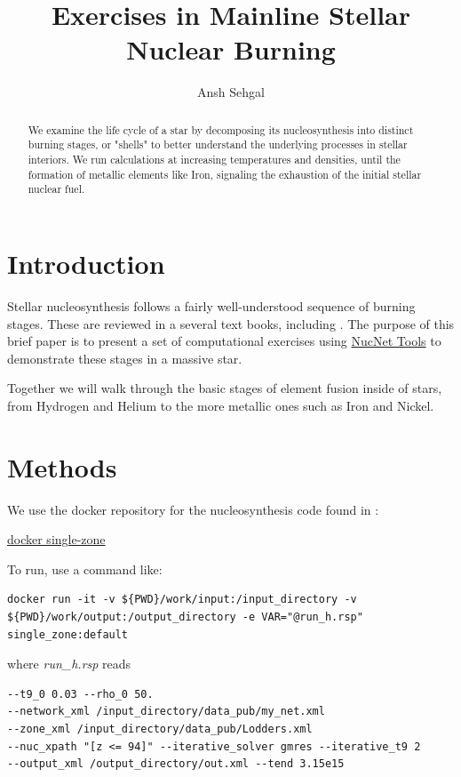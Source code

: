 \documentclass[manuscript]{aastex62}
\begin{document}
\title{Exercises in Mainline Stellar Nuclear Burning}


\author{Ansh Sehgal}

\begin{abstract}
We examine the life cycle of a star by decomposing its nucleosynthesis into distinct burning stages, or "shells" to better understand the underlying processes in stellar interiors. We run calculations at increasing temperatures and densities, until the formation of metallic elements like Iron, signaling the exhaustion of the initial stellar nuclear fuel.
\end{abstract}

\section{Introduction}

Stellar nucleosynthesis follows a fairly well-understood sequence of burning
stages.  These are reviewed in a several text books, including
\cite{1983psen.book.....C,1996snai.book.....A,2007nps..book.....I}.
The purpose of this brief paper is to present a set of computational
exercises using
\href{http://sourceforge.net/projects/nucnet-tools/}{NucNet Tools}
to demonstrate these stages in a massive star.

Together we will walk through the basic stages of element fusion inside of stars, from Hydrogen and Helium to the more metallic ones such as Iron and Nickel.

\section{Methods} \label{sec:docker}

We use the docker repository for the nucleosynthesis code found in :

\href{http://github.com/mbradle/docker_single_zone}{docker single-zone}


To run, use a command like:
\begin{lstlisting}
docker run -it -v ${PWD}/work/input:/input_directory -v ${PWD}/work/output:/output_directory -e VAR="@run_h.rsp" single_zone:default
\end{lstlisting}
where {\it run\_h.rsp} reads
\begin{verbatim}
--t9_0 0.03 --rho_0 50.
--network_xml /input_directory/data_pub/my_net.xml
--zone_xml /input_directory/data_pub/Lodders.xml
--nuc_xpath "[z <= 94]" --iterative_solver gmres --iterative_t9 2
--output_xml /output_directory/out.xml --tend 3.15e15
\end{verbatim}
\end{document}
